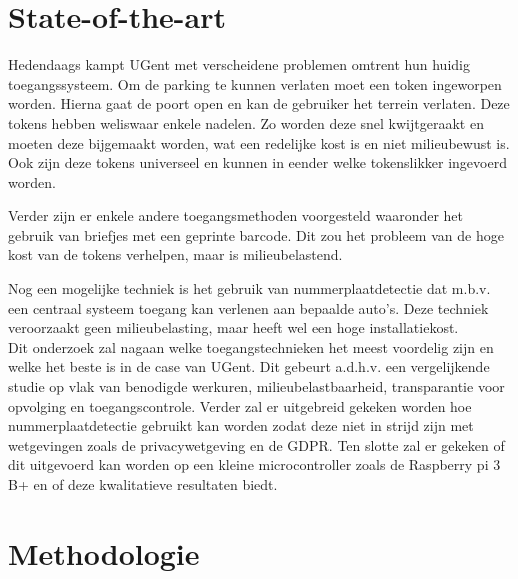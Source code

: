 
\section{State-of-the-art}
\label{sec:state-of-the-art}


Hedendaags kampt UGent met verscheidene problemen omtrent hun huidig toegangssysteem. Om de parking te kunnen verlaten moet een token ingeworpen worden. Hierna gaat de poort open en kan de gebruiker het terrein verlaten. Deze tokens hebben weliswaar enkele nadelen. Zo worden deze snel kwijtgeraakt en moeten deze bijgemaakt worden, wat een redelijke kost is en niet milieubewust is. Ook zijn deze tokens universeel en kunnen in eender welke tokenslikker ingevoerd worden.

Verder zijn er enkele andere toegangsmethoden voorgesteld waaronder het gebruik van briefjes met een geprinte barcode. Dit zou het probleem van de hoge kost van de tokens verhelpen, maar is milieubelastend.

Nog een mogelijke techniek is het gebruik van nummerplaatdetectie dat m.b.v. een centraal systeem toegang kan verlenen aan bepaalde auto’s. Deze techniek veroorzaakt geen milieubelasting, maar heeft wel een hoge installatiekost.
\\
Dit onderzoek zal nagaan welke toegangstechnieken het meest voordelig zijn en welke het beste is in de case van UGent. Dit gebeurt a.d.h.v. een vergelijkende studie op vlak van benodigde werkuren, milieubelastbaarheid, transparantie voor opvolging en toegangscontrole. Verder zal er uitgebreid gekeken worden hoe nummerplaatdetectie gebruikt kan worden zodat deze niet in strijd zijn met wetgevingen zoals de privacywetgeving en de GDPR. Ten slotte zal er gekeken of dit uitgevoerd kan worden op een kleine microcontroller zoals de Raspberry pi 3 B+ en of deze kwalitatieve resultaten biedt.


\section{Methodologie}
\label{sec:methodologie}

